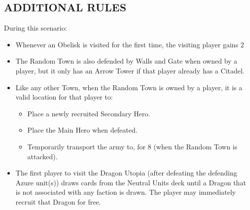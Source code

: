 \begin{multicols}{2}
\subsection*{\MakeUppercase{Additional Rules}}
During this scenario:
\begin{itemize}
  \item Whenever an Obelisk is visited for the first time, the visiting player gains 2 
  \item The Random Town is also defended by Walls and Gate when owned by a player, but it only has an Arrow Tower if that player already has a Citadel.
  \item Like any other Town, when the Random Town is owned by a player, it is a valid location for that player to:
    \begin{itemize}
      \item Place a newly recruited Secondary Hero.
      \item Place the Main Hero when defeated.
      \item Temporarily transport the army to, for 8  (when the Random Town is attacked).
    \end{itemize}
  \item The first player to visit the Dragon Utopia (after defeating the defending Azure unit(s)) draws cards from the Neutral Units  deck until a Dragon that is not associated with any faction is drawn.
    The player may immediately recruit that Dragon for free.
\end{itemize}

\columnbreak

\phantom{.}
\vfill
\begin{center}
\end{center}
\vfill
\phantom{.}
\end{multicols}


